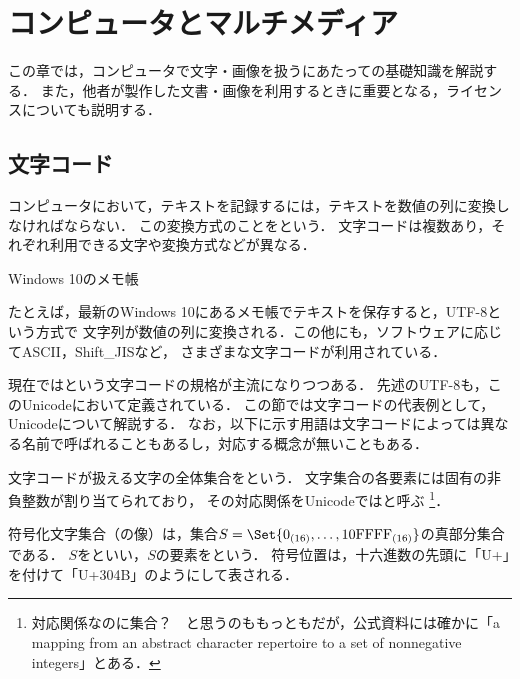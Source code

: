 \documentclass[../../index]{subfiles}
\begin{document}
\chapter{コンピュータとマルチメディア}
この章では，コンピュータで文字・画像を扱うにあたっての基礎知識を解説する．
また，他者が製作した文書・画像を利用するときに重要となる，ライセンスについても説明する．

\section{文字コード}
コンピュータにおいて，テキストを記録するには，テキストを数値の列に変換しなければならない．
この変換方式のことをという．
文字コードは複数あり，それぞれ利用できる文字や変換方式などが異なる．

\begin{floatingfigure}{\smallfiguresize}
  \centering
  \caption{Windows 10のメモ帳}
\end{floatingfigure}

たとえば，最新のWindows 10にあるメモ帳でテキストを保存すると，UTF-8という方式で
文字列が数値の列に変換される．この他にも，ソフトウェアに応じてASCII，Shift\_JISなど，
さまざまな文字コードが利用されている．

現在ではという文字コードの規格が主流になりつつある．
先述のUTF-8も，このUnicodeにおいて定義されている．
この節では文字コードの代表例として，Unicodeについて解説する．
なお，以下に示す用語は文字コードによっては異なる名前で呼ばれることもあるし，対応する概念が無いこともある．

文字コードが扱える文字の全体集合をという．
文字集合の各要素には固有の非負整数が割り当てられており，
その対応関係をUnicodeではと呼ぶ
\footnote{対応関係なのに集合？　と思うのももっともだが，公式資料には確かに「a mapping from an abstract character repertoire to a set of nonnegative integers」\cite{Whistler2008}とある．}．

符号化文字集合（の像）は，集合\(S=\Set{0_{(16)},\dots,\literal{10FFFF}_{(16)}}\)の真部分集合である．
\(S\)をといい，\(S\)の要素をという．
符号位置は，十六進数の先頭に「U+」を付けて「U+304B」のようにして表される．
\end{document}
